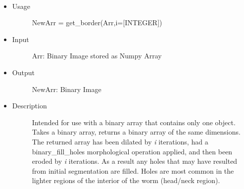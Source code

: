 \documentclass[letterpaper,10pt,oneside]{sphinxmanual}
\begin{document}

\begin{fulllineitems}
\label{index:libcelegans.fill_object}~\begin{itemize}
\item {} \begin{description}
\item[{Usage}] \leavevmode
NewArr = get\_border(Arr,i={[}INTEGER{]})

\end{description}

\item {} \begin{description}
\item[{Input }] \leavevmode
Arr: Binary Image stored as Numpy Array

\end{description}

\item {} \begin{description}
\item[{Output}] \leavevmode
NewArr: Binary Image

\end{description}

\item {} \begin{description}
\item[{Description}] \leavevmode
Intended for use with a binary array that contains only one object.
Takes a binary array, returns a binary array of the same dimensions.  
The returned array has been dilated by \emph{i} iterations, had a 
binary\_fill\_holes morphological operation applied, and then been 
eroded by \emph{i} iterations.  As a result any holes that may have resulted
from initial segmentation are filled.  Holes are most common in the 
lighter regions of the interior of the worm (head/neck region).

\end{description}

\end{itemize}

\end{fulllineitems}

\end{document}

